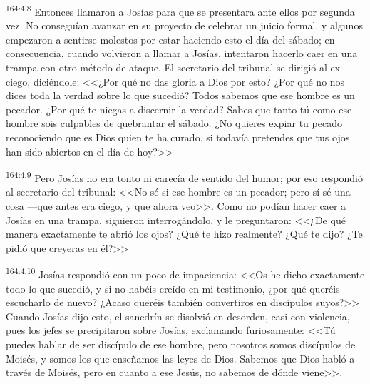 \par 
\textsuperscript{164:4.8} Entonces llamaron a Josías para que se presentara ante ellos por segunda vez. No conseguían avanzar en su proyecto de celebrar un juicio formal, y algunos empezaron a sentirse molestos por estar haciendo esto el día del sábado; en consecuencia, cuando volvieron a llamar a Josías, intentaron hacerlo caer en una trampa con otro método de ataque. El secretario del tribunal se dirigió al ex ciego, diciéndole: <<¿Por qué no das gloria a Dios por esto? ¿Por qué no nos dices toda la verdad sobre lo que sucedió? Todos sabemos que ese hombre es un pecador. ¿Por qué te niegas a discernir la verdad? Sabes que tanto tú como ese hombre sois culpables de quebrantar el sábado. ¿No quieres expiar tu pecado reconociendo que es Dios quien te ha curado, si todavía pretendes que tus ojos han sido abiertos en el día de hoy?>>

\par 
\textsuperscript{164:4.9} Pero Josías no era tonto ni carecía de sentido del humor; por eso respondió al secretario del tribunal: <<No sé si ese hombre es un pecador; pero sí sé una cosa ---que antes era ciego, y que ahora veo>>. Como no podían hacer caer a Josías en una trampa, siguieron interrogándolo, y le preguntaron: <<¿De qué manera exactamente te abrió los ojos? ¿Qué te hizo realmente? ¿Qué te dijo? ¿Te pidió que creyeras en él?>>

\par 
\textsuperscript{164:4.10} Josías respondió con un poco de impaciencia: <<Os he dicho exactamente todo lo que sucedió, y si no habéis creído en mi testimonio, ¿por qué queréis escucharlo de nuevo? ¿Acaso queréis también convertiros en discípulos suyos?>> Cuando Josías dijo esto, el sanedrín se disolvió en desorden, casi con violencia, pues los jefes se precipitaron sobre Josías, exclamando furiosamente: <<Tú puedes hablar de ser discípulo de ese hombre, pero nosotros somos discípulos de Moisés, y somos los que enseñamos las leyes de Dios. Sabemos que Dios habló a través de Moisés, pero en cuanto a ese Jesús, no sabemos de dónde viene>>.

